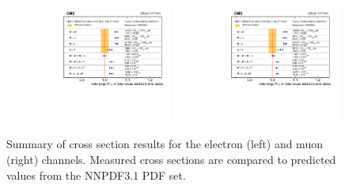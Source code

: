 \begin{figure}[htpb]
\includegraphics[width=0.49\textwidth]{plots/Results/xsecSummary13TeV_ele.pdf}
\includegraphics[width=0.49\textwidth]{plots/Results/xsecSummary13TeV_muon.pdf}
\caption{Summary of cross section results for the \serah electron (left) and muon (right) channels. Measured cross sections are compared to predicted values from the NNPDF3.1 PDF set.}
\label{fig:xs:13}
\end{figure}
